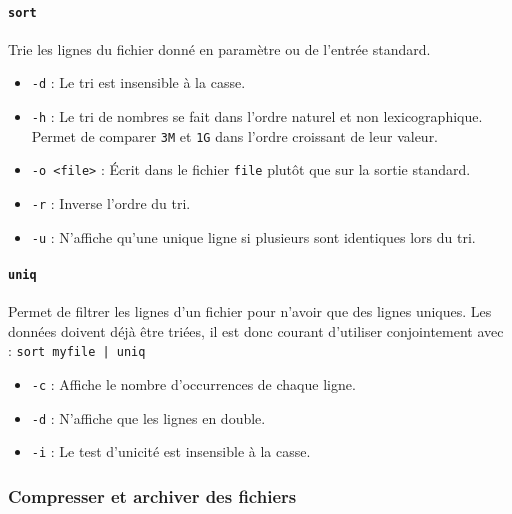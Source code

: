 \paragraph{\texttt{sort}} 
Trie les lignes du fichier donné en paramètre ou de l'entrée standard.
\begin{itemize}
    \item \texttt{-d} : Le tri est insensible à la casse.
    \item \texttt{-h} : Le tri de nombres se fait dans l'ordre naturel et non lexicographique. Permet de comparer \texttt{3M} et \texttt{1G} dans l'ordre croissant de leur valeur.
    \item \texttt{-o <file>} : Écrit dans le fichier \texttt{file} plutôt que sur la sortie standard.
    \item \texttt{-r} : Inverse l'ordre du tri.
    \item \texttt{-u} : N'affiche qu'une unique ligne si plusieurs sont identiques lors du tri.
\end{itemize}

\paragraph{\texttt{uniq}} 
Permet de filtrer les lignes d'un fichier pour n'avoir que des lignes uniques. Les données doivent déjà être triées, il est donc courant d'utiliser  conjointement avec  : \newline \texttt{sort myfile | uniq}
\begin{itemize}
    \item \texttt{-c} : Affiche le nombre d'occurrences de chaque ligne.
    \item \texttt{-d} : N'affiche que les lignes en double.
    \item \texttt{-i} : Le test d'unicité est insensible à la casse.
\end{itemize}

\newpage

\subsubsection{Compresser et archiver des fichiers}

